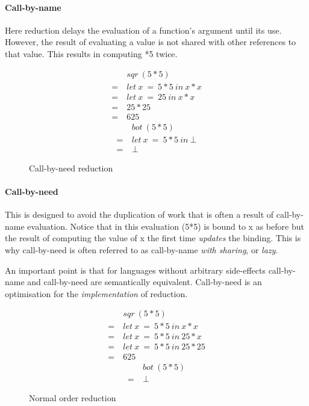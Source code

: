 \paragraph{Call-by-name} Here reduction delays the evaluation of a function's
argument until its use.  However, the result of evaluating a value is not
shared with other references to that value. This results in computing *5\>
twice.

\begin{figure}[H]
\centering
\begin{multicols}{2}
\noindent
\begin{align*}
     &sqr\ (5*5) \\
  =\ &let\ x\ =\ 5 * 5\ in\ x * x \\
  =\ &let\ x\ =\ 25\ in\ x * x \\
  =\ &25 * 25 \\
  =\ &625
\end{align*}
\begin{align*}
     &bot\ (5*5) \\
  =\ &let\ x\ =\ 5*5\ in\ \bot \\
  =\ &\bot
\end{align*}
\end{multicols}
\caption{Call-by-need reduction}
\label{fig:call-by-need}
\end{figure}

\paragraph{Call-by-need} This is designed to avoid the duplication of work that
is often a result of call-by-name evaluation. Notice that in this evaluation
\<(5*5)\> is bound to \<x\> as before but the result of computing the value of
\<x\> the first time \emph{updates} the binding. This is why call-by-need is
often referred to as call-by-name \emph{with sharing}, or \emph{lazy}.

An important point is that for languages without arbitrary side-effects call-by-name
and call-by-need are semantically equivalent. Call-by-need is an optimisation for the
\emph{implementation} of reduction.\\[1.5cm]


\begin{figure}[H]
\centering
\begin{multicols}{2}
\noindent
\begin{align*}
     &sqr\ (5*5) \\
  =\ &let\ x\ =\ 5 * 5\ in\ x * x \\
  =\ &let\ x\ =\ 5 * 5\ in\ 25 * x \\
  =\ &let\ x\ =\ 5 * 5\ in\ 25 * 25 \\
  =\ &625
\end{align*}
\begin{align*}
     &bot\ (5*5) \\
  =\ &\bot
\end{align*}
\end{multicols}
\caption{Normal order reduction}
\label{fig:normal-order}
\end{figure}

